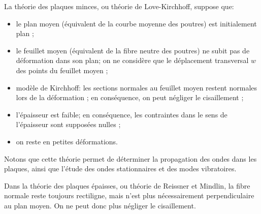 \begin{histoire}
\medskip
La théorie des plaques minces, ou théorie de Love-Kirchhoff, suppose que:
\begin{itemize}
   \item le plan moyen (équivalent de la courbe moyenne des poutres) est initialement plan ;
   \item le feuillet moyen (équivalent de la fibre neutre des poutres) ne subit pas de déformation
	dans son plan; on ne considère que le déplacement transversal $w$ des points du feuillet moyen ;
   \item modèle de Kirchhoff:
	les sections normales au feuillet moyen restent normales lors de la
	déformation ; en conséquence, on peut négliger le cisaillement ;
   \item l'épaisseur est faible; en conséquence, les contraintes dans le sens de l'épaisseur sont
	supposées nulles ;
   \item on reste en petites déformations.
\end{itemize}
Notons que cette théorie permet de déterminer la propagation des ondes dans les plaques,
ainsi que l'étude des ondes stationnaires et des modes vibratoires.

\medskip
Dans la théorie des plaques épaisses, ou théorie de Reissner
et Mindlin, la fibre normale reste
toujours rectiligne, mais n'est plus nécessairement perpendiculaire au plan moyen.
On ne peut donc plus négliger le cisaillement.
\end{histoire}

